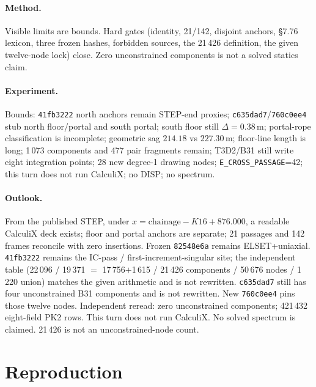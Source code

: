 \documentclass[11pt,a4paper]{article}
\begin{document}
\paragraph{Method.}
Visible limits are bounds. Hard gates (identity, 21/142, disjoint anchors,
\S7.76 lexicon, three frozen hashes, forbidden sources, the 21\,426
definition, the given twelve-node lock) close. Zero unconstrained
components is not a solved statics claim.

\paragraph{Experiment.}
Bounds: \texttt{41fb3222} north anchors remain STEP-end proxies;
\texttt{c635dad7}/\texttt{760c0ee4} stub north floor/portal and south
portal; south floor still \(\Delta=0.38\)\,m; portal-rope classification is
incomplete; geometric sag \(214.18\) vs \(227.30\)\,m; floor-line length is
long; 1\,073 components and 477 pair fragments remain; T3D2/B31 still
write eight integration points; 28 new degree-1 drawing nodes;
\texttt{E\_CROSS\_PASSAGE}=42; this turn does not run CalculiX; no DISP;
no spectrum.

\paragraph{Outlook.}
From the published STEP, under \(x=\mathrm{chainage}-K16+876.000\), a
readable CalculiX deck exists; floor and portal anchors are separate; 21
passages and 142 frames reconcile with zero insertions. Frozen
\texttt{82548e6a} remains ELSET+uniaxial. \texttt{41fb3222} remains the
IC-pass / first-increment-singular site; the independent table
(22\,096 / 19\,371 \(=\) 17\,756\(+\)1\,615 / 21\,426 components / 50\,676
nodes / 1\,220 union) matches the given arithmetic and is not rewritten.
\texttt{c635dad7} still has four unconstrained B31 components and is not
rewritten. New \texttt{760c0ee4} pins those twelve nodes. Independent
reread: zero unconstrained components; 421\,432 eight-field PK2 rows.
This turn does not run CalculiX. No solved spectrum is claimed.
21\,426 is not an unconstrained-node count.

\section*{Reproduction}
\end{document}
